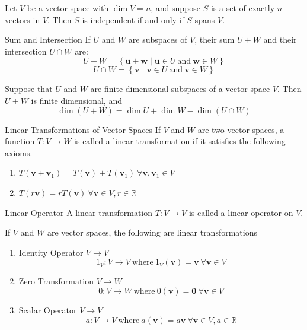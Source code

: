 \documentclass[12pt]{article}
\begin{document}
\begin{theorem}{}{}
    Let $ V $ be a vector space with $ \dim V = n $, and suppose $ S $ is a set of exactly $ n $ vectors in $ V $. Then $ S $ is independent if and only if $ S $ spans $ V $.
\end{theorem}

\begin{definition}{Sum and Intersection}{}
    If $ U $ and $ W $ are subspaces of $ V $, their sum $ U + W $ and their intersection $ U \cap W $ are:
    \[ U + W = \left\{ \mathbf{u} + \mathbf{w} \mid \mathbf{u} \in U \ \text{and} \ \mathbf{w} \in W \right\} \]
    \[ U \cap W = \left\{ \mathbf{v} \mid \mathbf{v} \in U \ \text{and} \ \mathbf{v} \in W \right\} \]
\end{definition}

\begin{theorem}{}{}
    Suppose that $ U $ and $ W $ are finite dimensional subspaces of a vector space $ V $. Then $ U + W $ is finite dimensional, and
    \[ \dim \left( U + W \right) = \dim U + \dim W - \dim \left( U \cap W \right) \]
\end{theorem}

\begin{definition}{Linear Transformations of Vector Spaces}{}
    If $ V $ and $ W $ are two vector spaces, a function $ T : V \to W $ is called a linear transformation if it satisfies the following axioms.
    \begin{enumerate}[label=(\roman*)]
        \item $ T \left( \mathbf{v} + \mathbf{v}_1 \right) = T \left( \mathbf{v} \right) + T \left( \mathbf{v}_1 \right) \ \forall \mathbf{v}, \mathbf{v}_1 \in V $
        \item $ T \left( r \mathbf{v} \right) = r T ( \mathbf{v} ) \ \forall \mathbf{v} \in V, r \in \mathbb{R} $
    \end{enumerate}
\end{definition}

\begin{definition}{Linear Operator}{}
    A linear transformation $ T : V \to V $ is called a linear operator on $ V $.
\end{definition}

\begin{note}{}{}
    If $ V $ and $ W $ are vector spaces, the following are linear transformations
    \begin{enumerate}[label=(\roman*)]
        \item Identity Operator $ V \to V $
        \[ 1_V : V \to V \ \text{where} \ 1_V \left( \mathbf{v} \right) = \mathbf{v} \ \forall \mathbf{v} \in V \]
        \item Zero Transformation $ V \to W $
        \[ 0 : V \to W \ \text{where} \ 0 \left( \mathbf{v} \right) = \mathbf{0} \ \forall \mathbf{v} \in V \]
        \item Scalar Operator $ V \to V $
        \[ a : V \to V \ \text{where} \ a \left( \mathbf{v} \right) = a \mathbf{v} \ \forall \mathbf{v} \in V, a \in \mathbb{R} \]
    \end{enumerate}
\end{note}
\end{document}
